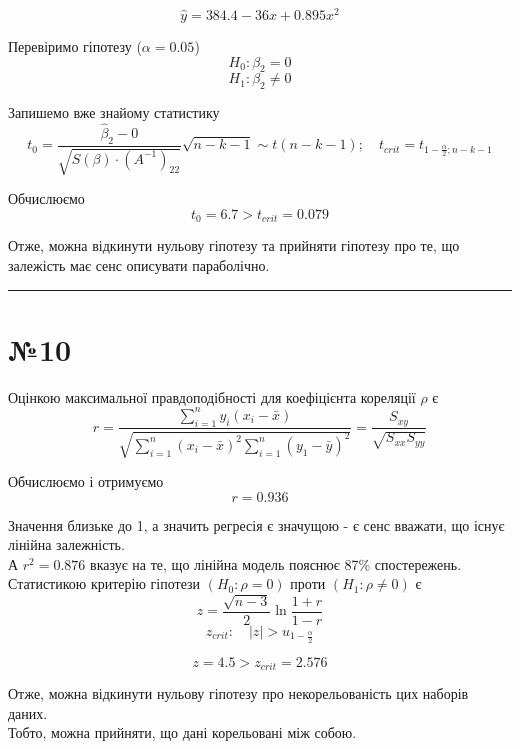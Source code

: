 \documentclass[11pt, a4paper]{article} %
\begin{document}
$$\hat y = 384.4 - 36 x + 0.895 x^2$$

Перевіримо гіпотезу ($\alpha=0.05$)
$$H_0 : \beta_2 = 0$$
$$H_1 : \beta_2 \ne 0$$

Запишемо вже знайому статистику
$$t_0 = \frac{\hat \beta_2 - 0}{\sqrt{S(\beta) \cdot \left(A^{-1}\right)_{22}}}\sqrt{n-k-1} \sim t(n-k-1); \quad t_{crit} = t_{1-\frac{\alpha}{2}; n-k-1}$$

Обчислюємо
$$t_0 = 6.7 > t_{crit} = 0.079$$

Отже, можна відкинути нульову гіпотезу та прийняти гіпотезу про те, що залежість має сенс описувати параболічно. 

\noindent\rule{\textwidth}{0.4pt}

\section*{№10}
Оцінкою максимальної правдоподібності для коефіцієнта кореляції $\rho$ є
$$r = \frac{\sum_{i=1}^n y_i (x_i-\bar x)}{\sqrt{\sum_{i=1}^n(x_i-\bar x)^2 \sum_{i=1}^n (y_1-\bar y)^2}} = \frac{S_{xy}}{\sqrt{S_{xx}S_{yy}}}$$

Обчислюємо і отримуємо
$$r = 0.936$$

Значення близьке до 1, а значить регресія є значущою - є сенс вважати, що існує лінійна залежність.\\
А $r^2 = 0.876$ вказує на те, що лінійна модель пояснює 87\% спостережень.\\  

Статистикою критерію гіпотези $(H_0: \rho = 0)$ проти $(H_1 : \rho \ne 0)$  є
$$z = \frac{\sqrt{n-3}}{2}\ln \frac{1+r}{1-r}$$
$$z_{crit}: \quad |z| > u_{1-\frac{\alpha}{2}}$$

$$z = 4.5 > z_{crit} = 2.576$$

Отже, можна відкинути нульову гіпотезу про некорельованість цих наборів даних. \\
Тобто, можна прийняти, що дані корельовані між собою.
\end{document}
